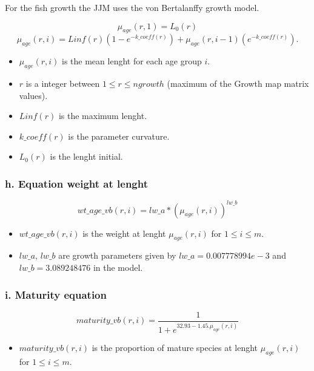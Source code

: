 \documentclass{article}
\begin{document}
For the fish growth the JJM uses the von Bertalanffy growth model.

\begin{equation}
    \mu_{age}(r,1)=L_0(r)
\end{equation}
\begin{equation}
    \mu_{age}(r,i)=Linf(r)(1-e^{-{k\_coeff(r)}})+\mu_{age}(r,i-1)(e^{-k\_{coeff(r)}}).
\end{equation}
 \begin{itemize}
    \item $\mu_{age}(r,i)$ is the mean lenght for each age group $i$.
     \item $r$ is a integer between $1\leq r \leq ngrowth$ (maximum of the Growth map matrix values). 
     \item $Linf(r)$ is the maximum lenght.
     \item $k\_coeff(r)$ is the parameter curvature.
     \item $L_0(r)$ is the lenght initial.
     
 \end{itemize}

\hfill

\subsubsection{h. Equation weight at lenght}
\begin{equation}
     wt\_age\_vb(r,i) = lw\_a * \left(\mu_{age}(r,i)\right)^{lw\_b}
 \end{equation}
 \begin{itemize}
     \item $wt\_age\_vb(r,i)$ is the weight at lenght $\mu_{age}(r,i)$ for $1\leq i \leq m$.
     \item $lw\_a$, $lw\_b$ are growth parameters given by  $lw\_a=0.007778994e-3$ and $lw\_b=3.089248476$ in the model.
 \end{itemize}

\hfill

\subsubsection{i. Maturity equation}
 \begin{equation}
    maturity\_vb(r,i) = \dfrac{1}{1+e^{32.93-1.45.\mu_{age}(r,i)}}
\end{equation}
\begin{itemize}
    \item $maturity\_vb(r,i)$ is the proportion of mature species at lenght $\mu_{age}(r,i)$ for $1\leq i \leq m$.
\end{itemize}
\end{document}
